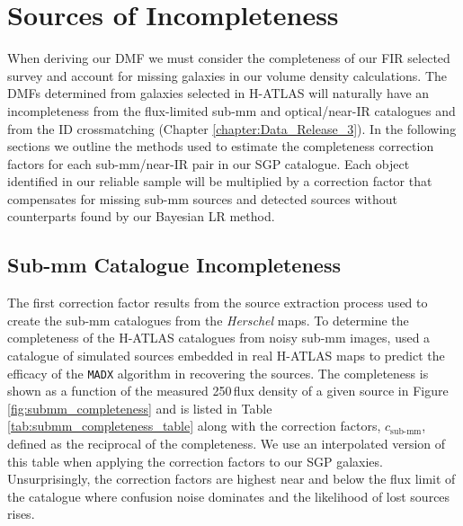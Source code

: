 \section{Sources of Incompleteness}

When deriving our DMF we must consider the completeness of our FIR selected survey and account for missing galaxies in our volume density calculations. The DMFs determined from galaxies selected in H-ATLAS will naturally have an incompleteness from the flux-limited sub-mm and optical/near-IR catalogues and from the ID crossmatching (Chapter \ref{chapter:Data_Release_3}). In the following sections we outline the methods used to estimate the completeness correction factors for each sub-mm/near-IR pair in our SGP catalogue. Each object identified in our reliable sample will be multiplied by a correction factor that compensates for missing sub-mm sources and detected sources without counterparts found by our Bayesian LR method. 

\subsection{Sub-mm Catalogue Incompleteness}

The first correction factor results from the source extraction process used to create the sub-mm catalogues from the \textit{Herschel} maps. To determine the completeness of the H-ATLAS catalogues from noisy sub-mm images, \citealt{Valiante_2016} used a catalogue of simulated sources embedded in real H-ATLAS maps to predict the efficacy of the \texttt{MADX} algorithm in recovering the sources. The completeness is shown as a function of the measured 250\,\micron flux density of a given source in Figure \ref{fig:submm_completeness} and is listed in Table \ref{tab:submm_completeness_table} along with the correction factors, $c_{\textrm{sub-mm}}$, defined as the reciprocal of the completeness. We use an interpolated version of this table when applying the correction factors to our SGP galaxies. Unsurprisingly, the correction factors are highest near and below the flux limit of the catalogue where confusion noise dominates and the likelihood of lost sources rises. 

